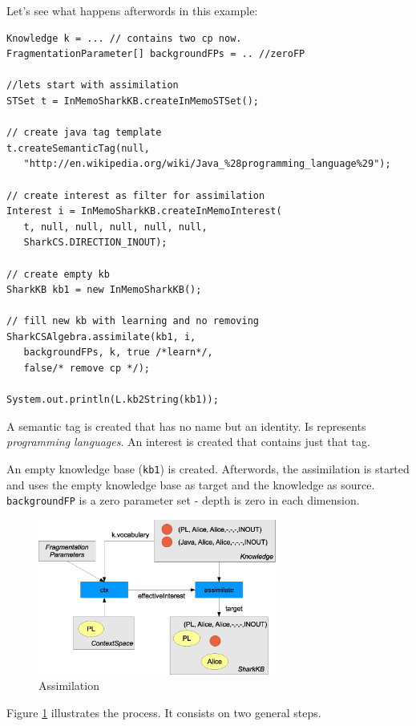 Let's see what happens afterwords in this example:

\begin{verbatim}
Knowledge k = ... // contains two cp now.
FragmentationParameter[] backgroundFPs = .. //zeroFP

//lets start with assimilation
STSet t = InMemoSharkKB.createInMemoSTSet();

// create java tag template
t.createSemanticTag(null, 
   "http://en.wikipedia.org/wiki/Java_%28programming_language%29");

// create interest as filter for assimilation
Interest i = InMemoSharkKB.createInMemoInterest(
   t, null, null, null, null, null, 
   SharkCS.DIRECTION_INOUT);

// create empty kb
SharkKB kb1 = new InMemoSharkKB();

// fill new kb with learning and no removing
SharkCSAlgebra.assimilate(kb1, i, 
   backgroundFPs, k, true /*learn*/, 
   false/* remove cp */);

System.out.println(L.kb2String(kb1));

\end{verbatim}

A semantic tag is created that has no name but an identity. Is represents {\it programming languages}. An interest is created that contains just that tag.

An empty knowledge base ({\tt kb1}) is created. Afterwords, the assimilation is started and uses the empty knowledge base as target and the knowledge as source. 
{\tt backgroundFP} is a zero parameter set - depth is zero in each dimension.

\begin{figure}[t]
\centering
\includegraphics[width=0.70\textwidth]{assimilation.eps}
\caption{Assimilation}
\label{fig:assimilation}
\end{figure}

Figure \ref{fig:assimilation} illustrates the process. It consists on two general steps.

